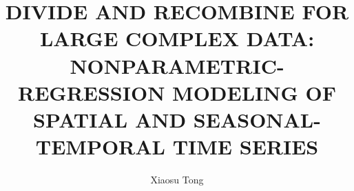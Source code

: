 \documentclass[stat,dissertation,nochapterblankpages]{puthesis}
\title{%
  DIVIDE AND RECOMBINE FOR LARGE COMPLEX DATA: \\
  NONPARAMETRIC-REGRESSION MODELING OF  \\
  SPATIAL AND SEASONAL-TEMPORAL TIME SERIES%
}
\author{Xiaosu Tong}{Tong, Xiaosu}
\begin{document}
\volume




%
%
\makeatletter
\def\@chapter[#1]#2{%
  \ifnum \c@secnumdepth >\m@ne
    \refstepcounter{chapter}%
    \typeout{\@chapapp\space\thechapter.}%
    \addcontentsline{toc}{chapter}{\protect\numberline{\thechapter}\uppercase{#1}}
  \fi
  \chaptermark{#1}%
  \@makechapterhead{#2}
  \@afterheading
  \ifthen{\not \boolean{@@inchapters}}
    {
      \pagenumbering{arabic}%
      \@@inchapterstrue
    }
}
\makeatother








%




%
%
%
%
%
%




\end{document}
